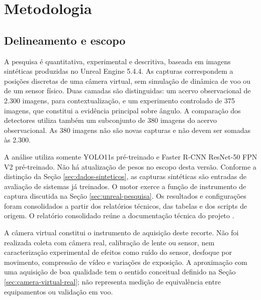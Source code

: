 \chapter{Metodologia}
\section{Delineamento e escopo}
A pesquisa é quantitativa, experimental e descritiva, baseada em imagens sintéticas produzidas no Unreal Engine 5.4.4. As capturas correspondem a posições discretas de uma câmera virtual, sem simulação de dinâmica de voo ou de um sensor físico. Duas camadas são distinguidas: um acervo observacional de 2.300 imagens, para contextualização, e um experimento controlado de 375 imagens, que constitui a evidência principal sobre ângulo. A comparação dos detectores utiliza também um subconjunto de 380 imagens do acervo observacional. As 380 imagens não são novas capturas e não devem ser somadas às 2.300.

A análise utiliza somente YOLO11s pré-treinado e Faster R-CNN ResNet-50 FPN V2 pré-treinado. Não há atualização de pesos no escopo desta versão. Conforme a distinção da Seção \ref{sec:dados-sinteticos}, as capturas sintéticas são entradas de avaliação de sistemas já treinados. O motor exerce a função de instrumento de captura discutida na Seção \ref{sec:unreal-pesquisa}. Os resultados e configurações foram consolidados a partir dos relatórios técnicos, das tabelas e dos scripts de origem. O relatório consolidado reúne a documentação técnica do projeto \cite{relatorio_projeto}.

A câmera virtual constitui o instrumento de aquisição deste recorte. Não foi realizada coleta com câmera real, calibração de lente ou sensor, nem caracterização experimental de efeitos como ruído do sensor, desfoque por movimento, compressão de vídeo e variações de exposição. A aproximação com uma aquisição de boa qualidade tem o sentido conceitual definido na Seção \ref{sec:camera-virtual-real}; não representa medição de equivalência entre equipamentos ou validação em voo.

